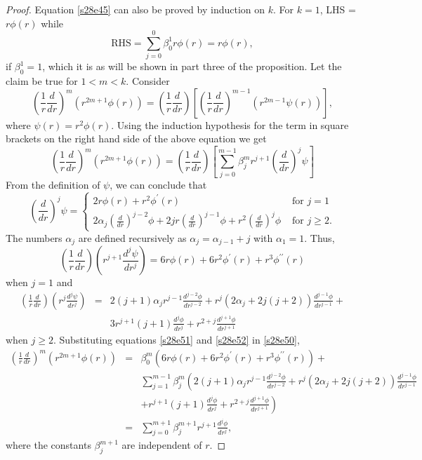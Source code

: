 \documentclass{article}
\theoremstyle{plain}
\numberwithin{thm}{section}
\theoremstyle{plain}
\numberwithin{prop}{section}
\theoremstyle{definition}
\numberwithin{defn}{section}
\theoremstyle{remark}
\numberwithin{equation}{section}
\begin{document}
\begin{proof}
Equation \eqref{s28e45} can also be proved by induction on $k$. For $k=1$, LHS = $r\phi(r)$ while
\[
\text{RHS} = \sum_{j=0}^0 \beta^1_0 r\phi(r) = r\phi(r),
\]
if $\beta^1_0 = 1$, which it is as will be shown in part three of the proposition. Let the claim be true for $1 < m 
< k$. Consider
\begin{equation}\label{s28e49}
\left(\frac{1}{r}\frac{d}{dr}\right)^m(r^{2m+1}\phi(r)) = 
\left(\frac{1}{r}\frac{d}{dr}\right)\left[\left(\frac{1}{r}\frac{d}{dr}\right)^{m-1}(r^{2m-1}\psi(r))\right],
\end{equation}
where $\psi(r) = r^2\phi(r)$. Using the induction hypothesis for the term in square brackets on the right hand
side of the above equation we get
\begin{equation}\label{s28e50}
\left(\frac{1}{r}\frac{d}{dr}\right)^m(r^{2m+1}\phi(r)) = 
\left(\frac{1}{r}\frac{d}{dr}\right)\left[\sum_{j=0}^{m-1}\beta^m_j r^{j+1}\left(\frac{d}{dr}\right)^j\psi\right]
\end{equation}
From the definition of $\psi$, we can conclude that 
\[
\left(\frac{d}{dr}\right)^j\psi = \begin{cases}
2r\phi(r) + r^2\phi^\prime(r) & \text{ for } j = 1 \\ 
2\alpha_j \left(\frac{d}{dr}\right)^{j-2}\phi + 
2jr\left(\frac{d}{dr}\right)^{j-1}\phi + r^2\left(\frac{d}{dr}\right)^j\phi & \text{ for } j \ge 2.
\end{cases}
\]
The numbers $\alpha_j$ are defined recursively as $\alpha_j = \alpha_{j-1} + j$ with $\alpha_1 = 1$. Thus,
\begin{equation}\label{s28e51}
\left(\frac{1}{r}\frac{d}{dr}\right)\left(r^{j+1}\frac{d^j\psi}{dr^j}\right) = 
6r\phi(r) + 6r^2\phi^{\prime}(r) + r^3\phi^{\prime\prime}(r)
\end{equation}
when $j = 1$ and 
\begin{eqnarray}
\left(\frac{1}{r}\frac{d}{dr}\right)\left(r^j\frac{d^j\psi}{dr^j}\right) &=&
2(j+1)\alpha_j r^{j-1}\frac{d^{j-2}\phi}{dr^{j-2}} + 
r^j(2\alpha_j + 2j(j+2))\frac{d^{j-1}\phi}{dr^{j-1}} + \nonumber \\
& & 3r^{j+1}(j+1)\frac{d^j\phi}{dr^j} + r^{2+j}\frac{d^{j+1}\phi}{dr^{j+1}} \label{s28e52}
\end{eqnarray}
when $j \ge 2$. Substituting equations \eqref{s28e51} and \eqref{s28e52} in \eqref{s28e50},
\begin{eqnarray*}
\left(\frac{1}{r}\frac{d}{dr}\right)^m(r^{2m+1}\phi(r)) &=& 
\beta^m_0 (6r\phi(r) + 6r^2\phi^{\prime}(r) + r^3\phi^{\prime\prime}(r)) + \\
& & \sum_{j=1}^{m-1}\beta^m_j\left(2(j+1)\alpha_j r^{j-1}\frac{d^{j-2}\phi}{dr^{j-2}} + 
r^j(2\alpha_j + 2j(j+2))\frac{d^{j-1}\phi}{dr^{j-1}}\right.\\ 
& & \left. + r^{j+1}(j+1)\frac{d^j\phi}{dr^j} + r^{2+j}\frac{d^{j+1}\phi}{dr^{j+1}}\right) \\
&=& \sum_{j=0}^{m+1}\beta^{m+1}_j r^{j+1}\frac{d^j\phi}{dr^j},
\end{eqnarray*}
where the constants $\beta^{m+1}_j$ are independent of $r$.


\end{proof}
\end{document}
